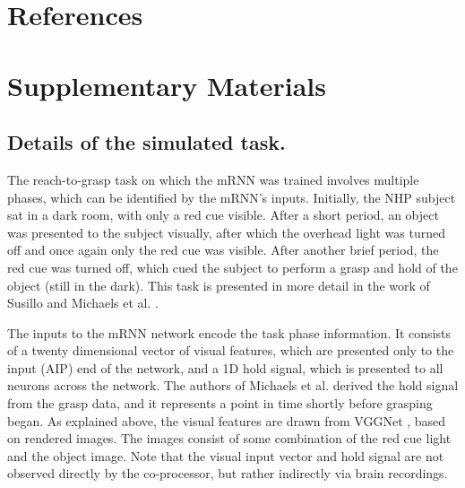 \documentclass[12pt]{iopart}
\begin{document}

\section{References}



\newpage

\section{Supplementary Materials}
\subsection{Details of the simulated task.}
\label{sup:michaelstask}

The reach-to-grasp task on which the mRNN was trained involves multiple phases, which can be identified by the
mRNN's inputs. Initially, the NHP subject sat in a dark room, with only a red cue visible. After a short period,
an object was presented to the subject visually, after which the overhead light was turned off and once again only the red
cue was visible. After another brief period, the red cue was turned off, which cued the subject to perform a grasp and hold of
the object (still in the dark). This task is presented in more detail in the work of Susillo \cite{susillo.mrnn} and Michaels et al.
\cite{michaels.mrnn}.

The inputs to the mRNN network encode the task phase information. It consists of a twenty dimensional vector of visual
features, which are presented only to the input (AIP) end of the network, and a 1D hold signal, which is presented to all
neurons across the network. The authors of Michaels et al. \cite{michaels.mrnn} derived the hold signal
from the grasp data, and it represents a point in time shortly before grasping began. As explained above, the visual features are
drawn from VGGNet \cite{simonyan.vgg}, based on rendered images. The images consist of some combination of the red cue
light and the object image. Note that the visual input vector and hold signal are not observed directly by the co-processor,
but rather indirectly via brain recordings.
\end{document}
